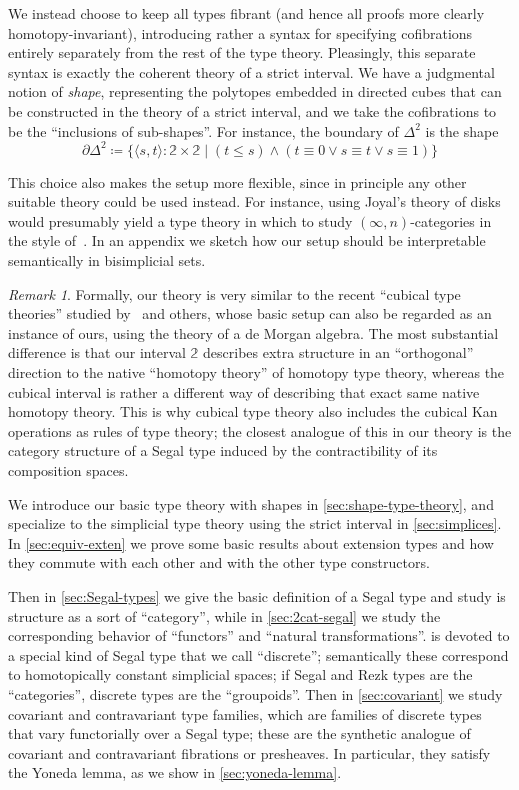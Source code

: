 \documentclass[12pt]{amsart}
\theoremstyle{plain}
\theoremstyle{definition}
\theoremstyle{remark}
\newtheorem{rmk}[thm]{Remark}
\numberwithin{equation}{section}
\newcommand{\jdeq}{\equiv}
\newcommand{\defeq}{\coloneqq}
\newcommand{\sh}[2]{\{#1\mid #2\}}
\newcommand{\pair}[1]{\langle #1\rangle}
\newcommand{\two}{\mathbb{2}}
\begin{document}
We instead choose to keep all types fibrant (and hence all proofs more clearly homotopy-invariant), introducing rather a syntax for specifying cofibrations entirely separately from the rest of the type theory.
Pleasingly, this separate syntax is exactly the coherent theory of a strict interval.
We have a judgmental notion of \emph{shape}, representing the polytopes embedded in directed cubes that can be constructed in the theory of a strict interval, and we take the cofibrations to be the ``inclusions of sub-shapes''.
For instance, the boundary of $\Delta^2$ is the shape
\[ \partial\Delta^2 \defeq \sh{\pair{s,t}:\two\times\two}{(t\le s) \land (t\jdeq 0 \lor s\jdeq t \lor s\jdeq 1)} \]

This choice also makes the setup more flexible, since in principle any other suitable theory could be used instead.
For instance, using Joyal's theory of disks~\cite{disks} would presumably yield a type theory in which to study $(\infty,n)$-categories in the style of~\cite{rezk-theta}.
In an appendix we sketch how our setup should be interpretable semantically in bisimplicial sets.

\begin{rmk}
  Formally, our theory is very similar to the recent ``cubical type theories'' studied by~\cite{CCHM} and others, whose basic setup can also be regarded as an instance of ours, using the theory of a de Morgan algebra.
  The most substantial difference is that our interval $\two$ describes extra structure in an ``orthogonal'' direction to the native ``homotopy theory'' of homotopy type theory, whereas the cubical interval is rather a different way of describing that exact same native homotopy theory.
  This is why cubical type theory also includes the cubical Kan operations as rules of type theory; the closest analogue of this in our theory is the category structure of a Segal type induced by the contractibility of its composition spaces.
\end{rmk}

We introduce our basic type theory with shapes in \cref{sec:shape-type-theory}, and specialize to the simplicial type theory using the strict interval in \cref{sec:simplices}.
In \cref{sec:equiv-exten} we prove some basic results about extension types and how they commute with each other and with the other type constructors.

Then in \cref{sec:Segal-types} we give the basic definition of a Segal type and study is structure as a sort of ``category'', while in \cref{sec:2cat-segal} we study the corresponding behavior of ``functors'' and ``natural transformations''.
 is devoted to a special kind of Segal type that we call ``discrete''; semantically these correspond to homotopically constant simplicial spaces; if Segal and Rezk types are the ``categories'', discrete types are the ``groupoids''.
Then in \cref{sec:covariant} we study covariant and contravariant type families, which are families of discrete types that vary functorially over a Segal type; these are the synthetic analogue of covariant and contravariant fibrations or presheaves.
In particular, they satisfy the Yoneda lemma, as we show in \cref{sec:yoneda-lemma}.
\end{document}
